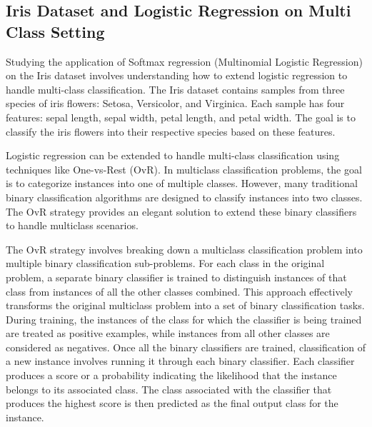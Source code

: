\documentclass[12pt, a4paper, twoside]{article}
\begin{document}
\subsection{Iris Dataset and Logistic Regression on Multi Class Setting}
Studying the application of Softmax regression (Multinomial Logistic Regression) on the Iris dataset involves understanding how to extend logistic regression to handle multi-class classification. The Iris dataset contains samples from three species of iris flowers: Setosa, Versicolor, and Virginica. Each sample has four features: sepal length, sepal width, petal length, and petal width. The goal is to classify the iris flowers into their respective species based on these features.
\par
Logistic regression can be extended to handle multi-class classification using techniques like One-vs-Rest (OvR).  In multiclass classification problems, the goal is to categorize instances into one of multiple classes. However, many traditional binary classification algorithms are designed to classify instances into two classes. The OvR strategy provides an elegant solution to extend these binary classifiers to handle multiclass scenarios.
\par
The OvR strategy involves breaking down a multiclass classification problem into multiple binary classification sub-problems. For each class in the original problem, a separate binary classifier is trained to distinguish instances of that class from instances of all the other classes combined. This approach effectively transforms the original multiclass problem into a set of binary classification tasks. During training, the instances of the class for which the classifier is being trained are treated as positive examples, while instances from all other classes are considered as negatives. Once all the binary classifiers are trained, classification of a new instance involves running it through each binary classifier. Each classifier produces a score or a probability indicating the likelihood that the instance belongs to its associated class. The class associated with the classifier that produces the highest score is then predicted as the final output class for the instance.
\end{document}
